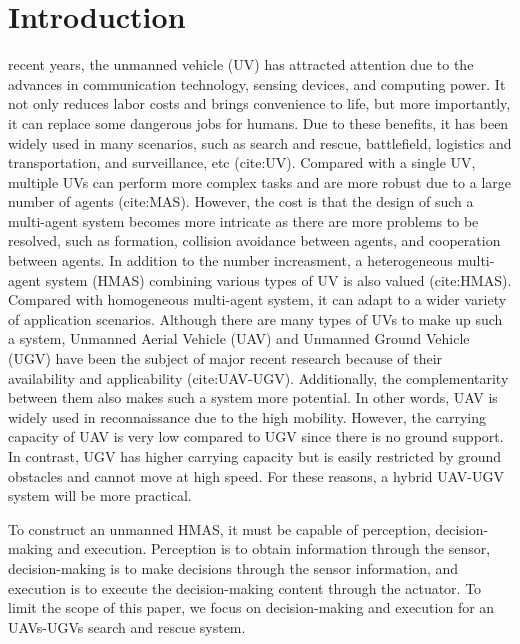 \documentclass{ieeeaccess}
\begin{document}
\section{Introduction}
 recent years, the unmanned vehicle (UV) has attracted attention due to the advances in communication technology, sensing devices, and computing power. It not only reduces labor costs and brings convenience to life, but more importantly, it can replace some dangerous jobs for humans. Due to these benefits, it has been widely used in many scenarios, such as search and rescue, battlefield, logistics and transportation, and surveillance, etc (cite:UV). Compared with a single UV, multiple UVs can perform more complex tasks and are more robust due to a large number of agents (cite:MAS). However, the cost is that the design of such a multi-agent system becomes more intricate as there are more problems to be resolved, such as formation, collision avoidance between agents, and cooperation between agents. In addition to the number increasment, a heterogeneous multi-agent system (HMAS) combining various types of UV is also valued (cite:HMAS). Compared with homogeneous multi-agent system, it can adapt to a wider variety of application scenarios. Although there are many types of UVs to make up such a system, Unmanned Aerial Vehicle (UAV) and Unmanned Ground Vehicle (UGV) have been the subject of major recent research because of their availability and applicability (cite:UAV-UGV). Additionally, the complementarity between them also makes such a system more potential. In other words, UAV is widely used in reconnaissance due to the high mobility. However, the carrying capacity of UAV is very low compared to UGV since there is no ground support. In contrast, UGV has higher carrying capacity but is easily restricted by ground obstacles and cannot move at high speed. For these reasons, a hybrid UAV-UGV system will be more practical.

To construct an unmanned HMAS, it must be capable of perception, decision-making and execution. Perception is to obtain information through the sensor, decision-making is to make decisions through the sensor information, and execution is to execute the decision-making content through the actuator. To limit the scope of this paper, we focus on decision-making and execution for an UAVs-UGVs search and rescue system.
\end{document}
